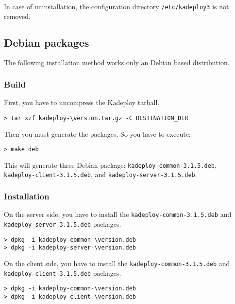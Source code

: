 \documentclass[a4wide,10pt,oneside]{book}
\newcommand{\version}{3.1.5}
\begin{document}
\noindent In case of uninstallation, the configuration directory \texttt{/etc/kadeploy3} is not removed.

\subsection{Debian packages}
The following installation method works only an Debian based distribution.
\subsubsection{Build}
\noindent First, you have to uncompress the Kadeploy tarball. 
\begin{small}
\begin{Verbatim}[commandchars=\\\{\}]
> tar xzf kadeploy-\version.tar.gz -C DESTINATION_DIR
\end{Verbatim}
\end{small}

\noindent Then you must generate the packages. So you have to execute:
\begin{small}
\begin{verbatim}
> make deb
\end{verbatim}
\end{small}
This will generate three Debian package: \texttt{kadeploy-common-\version.deb}, \texttt{kadeploy-client-\version.deb}, and \texttt{kadeploy-server-\version.deb}.
\subsubsection{Installation}
\noindent On the server side, you have to install the \texttt{kadeploy-common-\version.deb} and \texttt{kadeploy-server-\version.deb} packages.
\begin{small}
\begin{Verbatim}[commandchars=\\\{\}]
> dpkg -i kadeploy-common-\version.deb
> dpkg -i kadeploy-server-\version.deb
\end{Verbatim}
\end{small}

\noindent On the client side, you have to install the \texttt{kadeploy-common-\version.deb} and \texttt{kadeploy-client-\version.deb} packages.
\begin{small}
\begin{Verbatim}[commandchars=\\\{\}]
> dpkg -i kadeploy-common-\version.deb
> dpkg -i kadeploy-client-\version.deb
\end{Verbatim}
\end{small}
\end{document}
